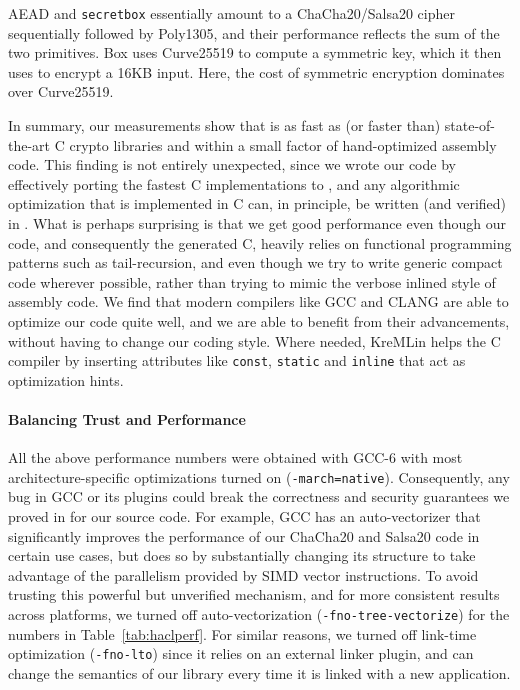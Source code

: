 \documentclass[acmsmall,review,anonymous]{acmart}\settopmatter{printfolios=true}
\begin{document}
AEAD and \texttt{secretbox} essentially amount to a ChaCha20/Salsa20 cipher sequentially
followed by Poly1305, and their performance reflects the sum of the two primitives.
%
Box uses Curve25519 to compute a symmetric key, which it then uses to encrypt 
a 16KB input. Here, the cost of symmetric encryption dominates over Curve25519.

In summary, our measurements show that \haclstar is as fast as (or faster than)
state-of-the-art C crypto libraries and within a small factor of hand-optimized assembly code.
%
This finding is not entirely unexpected, since we wrote our \lowstar code 
by effectively porting the fastest C implementations to \fstar, and any
algorithmic optimization that is implemented in C can, in principle,
be written (and verified) in \lowstar.
%
What is perhaps surprising is that we get good performance even though
our \lowstar code, and consequently the generated C, heavily relies on 
functional programming patterns such as tail-recursion, and even though
we try to write generic compact code wherever possible, rather than trying 
to mimic the verbose inlined style of assembly code.
%
We find that modern compilers like GCC and CLANG are able to optimize
our code quite well, and we are able to benefit from their advancements,
without having to change our coding style.
%
Where needed, KreMLin helps the C compiler by inserting attributes like
\texttt{const}, \texttt{static} and \texttt{inline} that act as optimization hints.

\paragraph*{Balancing Trust and Performance}
%
All the above performance numbers were obtained with GCC-6 with most
architecture-specific optimizations turned on
(\texttt{-march=native}).  Consequently, any bug in GCC or its plugins
could break the correctness and security guarantees we proved in
\fstar for our source code.  For example, GCC has an auto-vectorizer
that significantly improves the performance of our ChaCha20 and
Salsa20 code in certain use cases, but does so by substantially
changing its structure to take advantage of the parallelism provided
by SIMD vector instructions. To avoid trusting this powerful 
but unverified mechanism, and for more consistent results across platforms,
we turned off auto-vectorization (\texttt{-fno-tree-vectorize}) 
for the numbers in Table~\ref{tab:haclperf}. For similar reasons, 
we turned off link-time optimization (\texttt{-fno-lto}) since 
it relies on an external linker plugin, and can change the 
semantics of our library every time it is linked with a new application.
\end{document}
